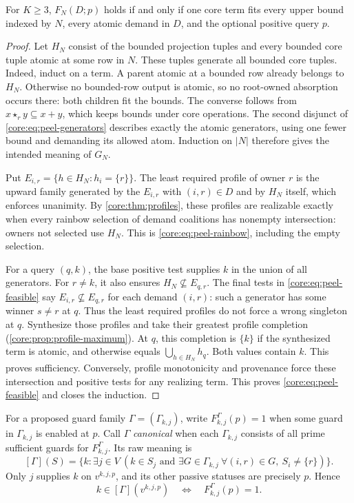 \begin{theorem}\label{core:thm:peeling}
For $K\geq3$, $F_N(D;p)$ holds if and only if one core term fits every
upper bound indexed by $N$, every atomic demand in $D$, and the
optional positive query $p$.
\end{theorem}
\begin{proof}
Let $H_N$ consist of the bounded projection tuples and every bounded
core tuple atomic at some row in $N$. These tuples generate all bounded
core tuples. Indeed, induct on a term. A parent atomic at a bounded
row already belongs to $H_N$. Otherwise no bounded-row output is atomic,
so no root-owned absorption occurs there: both children fit the bounds.
The converse follows from $x\star_r y\subseteq x+y$, which keeps bounds
under core operations. The second disjunct of
\eqref{core:eq:peel-generators} describes exactly the atomic generators,
using one fewer bound and demanding its allowed atom. Induction on $|N|$
therefore gives the intended meaning of $G_N$.

Put $E_{i,r}=\{h\in H_N:h_i=\{r\}\}$.
The least required profile of owner $r$ is the upward family generated
by the $E_{i,r}$ with $(i,r)\in D$ and by $H_N$ itself, which enforces
unanimity. By \cref{core:thm:profiles}, these profiles are realizable
exactly when every rainbow selection of demand coalitions has nonempty
intersection: owners not selected use $H_N$. This is
\eqref{core:eq:peel-rainbow}, including the empty selection.

For a query $(q,k)$, the base positive test supplies $k$ in the union
of all generators.
For $r\ne k$, it also ensures $H_N\not\subseteq E_{q,r}$.
The final tests in \eqref{core:eq:peel-feasible} say
$E_{i,r}\not\subseteq E_{q,r}$ for each demand $(i,r)$:
such a generator has some winner $s\ne r$ at $q$.
Thus the least required profiles do not force a wrong singleton at $q$.
Synthesize those profiles and take their greatest profile completion
(\cref{core:prop:profile-maximum}). At $q$, this completion is $\{k\}$
if the synthesized term is atomic, and otherwise equals
$\bigcup_{h\in H_N}h_q$. Both values contain $k$. This proves sufficiency. Conversely, profile monotonicity and
provenance force these intersection and positive tests for any realizing
term. This proves \eqref{core:eq:peel-feasible} and closes the induction.
\end{proof}

For a proposed guard family $\Gamma=(\Gamma_{k,j})$, write
$F^\Gamma_{k,j}(p)=1$ when some guard in $\Gamma_{k,j}$ is enabled at
$p$. Call $\Gamma$ \emph{canonical} when each $\Gamma_{k,j}$ consists
of all prime sufficient guards for $F^\Gamma_{k,j}$. Its raw meaning is
\[
 [\Gamma](S)=\{k:\exists j\in V\ (k\in S_j\text{ and }
 \exists G\in\Gamma_{k,j}\ \forall(i,r)\in G,\ S_i\ne\{r\})\}.
\]
Only $j$ supplies $k$ on $v^{k,j,p}$, and its other passive statuses
are precisely $p$. Hence
\[
 k\in[\Gamma](v^{k,j,p})\quad\Longleftrightarrow\quad
 F^\Gamma_{k,j}(p)=1.                                      \tag{$*$}
\]

